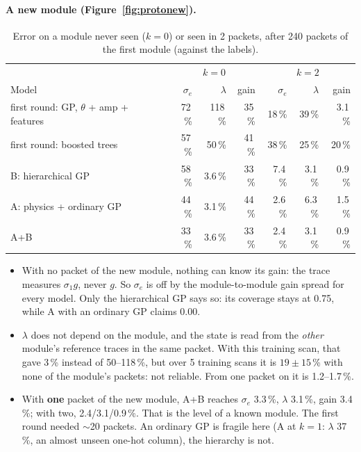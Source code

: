 \documentclass[10pt]{article}
\begin{document}
\paragraph{A new module (Figure~\ref{fig:protonew}).}
\begin{table}[h]
\centering\small
\begin{tabular}{lrrrrrr}
\toprule
& \multicolumn{3}{c}{$k=0$} & \multicolumn{3}{c}{$k=2$} \\
Model & $\sigma_e$ & $\lambda$ & gain & $\sigma_e$ & $\lambda$ & gain \\
\midrule
first round: GP, $\theta$ + amp + features & 72\,\% & 118\,\% & 35\,\% & 18\,\% & 39\,\% & 3.1\,\% \\
first round: boosted trees & 57\,\% & 50\,\% & 41\,\% & 38\,\% & 25\,\% & 20\,\% \\
B: hierarchical GP & 58\,\% & 3.6\,\% & 33\,\% & 7.4\,\% & 3.1\,\% & 0.9\,\% \\
A: physics + ordinary GP & 44\,\% & 3.1\,\% & 44\,\% & 2.6\,\% & 6.3\,\% & 1.5\,\% \\
A+B & 33\,\% & 3.6\,\% & 33\,\% & 2.4\,\% & 3.1\,\% & 0.9\,\% \\
\bottomrule
\end{tabular}
\caption{Error on a module never seen ($k=0$) or seen in 2 packets, after 240 packets of the first module (against the labels).}
\label{tab:protonew}
\end{table}
\begin{itemize}
\item With no packet of the new module, nothing can know its gain: the trace measures $\sigma_1 g$, never $g$. So $\sigma_e$ is off by the
  module-to-module gain spread for every model. Only the hierarchical GP says so: its coverage stays at 0.75, while A with an ordinary GP
  claims 0.00.
\item $\lambda$ does not depend on the module, and the state is read from the \emph{other} module's reference traces in the same packet.
  With this training scan, that gave 3\,\% instead of 50--118\,\%, but over 5 training scans it is $19 \pm 15$\,\% with none of the
  module's packets: not reliable. From one packet on it is 1.2--1.7\,\%.
\item With \textbf{one} packet of the new module, A+B reaches $\sigma_e$ 3.3\,\%, $\lambda$ 3.1\,\%, gain 3.4\,\%; with two, 2.4/3.1/0.9\,\%.
  That is the level of a known module. The first round needed $\sim$20 packets. An ordinary GP is fragile here (A at $k=1$: $\lambda$
  37\,\%, an almost unseen one-hot column), the hierarchy is not.
\end{itemize}
\end{document}
